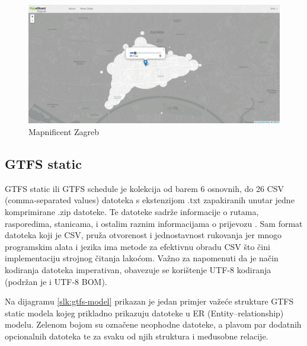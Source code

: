 \documentclass[zavrsnirad]{fer}
\begin{document}
\begin{figure}[htb]
  \centering
  \includegraphics[width=0.9\linewidth]{Figures/mapnificent-zagreb.jpg} 
  \caption{Mapnificent Zagreb}
  \label{slk:mapnificent-zagreb}
\end{figure}

\subsection{GTFS static}

GTFS static ili GTFS schedule je kolekcija od barem 6 osnovnih, do 26 CSV (comma-separated
values) datoteka s ekstenzijom .txt zapakiranih unutar jedne komprimirane .zip datoteke. Te datoteke
sadrže informacije o rutama, rasporedima, stanicama, i ostalim raznim informacijama o prijevozu \cite{GTFS-schedule}. Sam format datoteka koji je CSV, pruža otvorenost i jednostavnost rukovanja jer mnogo programskim alata i jezika ima metode za efektivnu obradu CSV što čini implementaciju strojnog čitanja lakoćom. Važno za napomenuti da je način kodiranja datoteka imperativan, obavezuje se korištenje UTF-8 kodiranja (podržan je i UTF-8 BOM).


Na dijagramu \ref{slk:gtfs-model} prikazan je jedan primjer važeće strukture GTFS static modela kojeg prikladno prikazuju datoteke u ER (Entity–relationship) modelu. Zelenom bojom su označene neophodne datoteke, a plavom par dodatnih opcionalnih datoteka te za svaku od njih struktura i međusobne relacije. 
\end{document}
